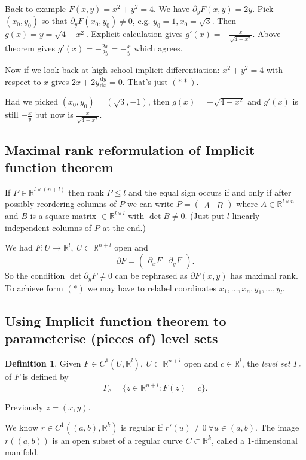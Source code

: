 \documentclass[a4paper]{article}
\theoremstyle{definition}
\newtheorem{defn}{Definition}[subsection]
\begin{document}
Back to example $F(x,y)=x^2+y^2=4.$ We have $\partial_y F(x,y)=2y$. Pick $(x_0,y_0)$ so that $\partial_y F(x_0,y_0) \neq 0$, e.g. $y_0=1,x_0=\sqrt{3}$. Then $g(x)=y=\sqrt{4-x^2}$. Explicit calculation gives $g'(x) =-\frac{x}{\sqrt{4-x^2}}$. Above theorem gives $g'(x) = -\frac{2x}{2y} = -\frac{x}{y}$ which agrees.

Now if we look back at high school implicit differentiation: $x^2+y^2=4$ with respect to $x$ gives $2x+2y \frac{\mathrm d y}{\mathrm d x}=0$. That's just $(\ast\ast)$.

Had we picked $(x_0,y_0)=(\sqrt{3},-1)$, then $g(x) = -\sqrt{4-x^2}$ and $g'(x)$ is still $-\frac{x}{y}$ but now is $\frac{x}{\sqrt{4-x^2}}$.

\subsection{Maximal rank reformulation of Implicit function theorem}
If $P\in \mathbb R^{l\times (n+l)}$ then rank $P \leq l$ and the equal sign occurs if and only if after possibly reordering columns of $P$ we can write $P=\begin{pmatrix}
    A & B
\end{pmatrix}$ where $A\in \mathbb R^{l\times n}$ and $B$ is a square matrix $\in \mathbb R^{l\times l}$ with $\det B\neq 0$. (Just put $l$ linearly independent columns of $P$ at the end.)

We had $F:U\rightarrow \mathbb R^l,\ U \subset \mathbb R^{n+l}$ open and
\[
\partial F= \begin{pmatrix}
    \partial_x F & \partial_y F
\end{pmatrix}.
\tag{$\ast$}
\]So the condition $\det \partial_y F\neq 0$ can be rephrased as $\partial F(x,y)$ has maximal rank. To achieve form $(\ast)$ we may have to relabel coordinates $x_1,\ldots,x_n,y_1,\ldots,y_l$.

\subsection{Using Implicit function theorem to parameterise (pieces of) level sets}
\begin{defn}
Given $F\in C^1(U,\mathbb R^l),\ U\subset \mathbb R^{n+l}$ open and $c\in \mathbb R^l$, the \textit{level set $\Gamma_c$} of $F$ is defined by 
\[
\Gamma_c =\{z\in \mathbb R^{n+l}:F(z)=c\}.
\]
\end{defn}
Previously $z=(x,y)$.

We know $r\in C^1\left((a,b),\mathbb R^k\right)$ is regular if $r'(u)\neq 0 \ \forall u\in (a,b)$. The image $r((a,b))$ is an open subset of a regular curve $C\subset \mathbb R^k$, called a 1-dimensional manifold.
\end{document}
